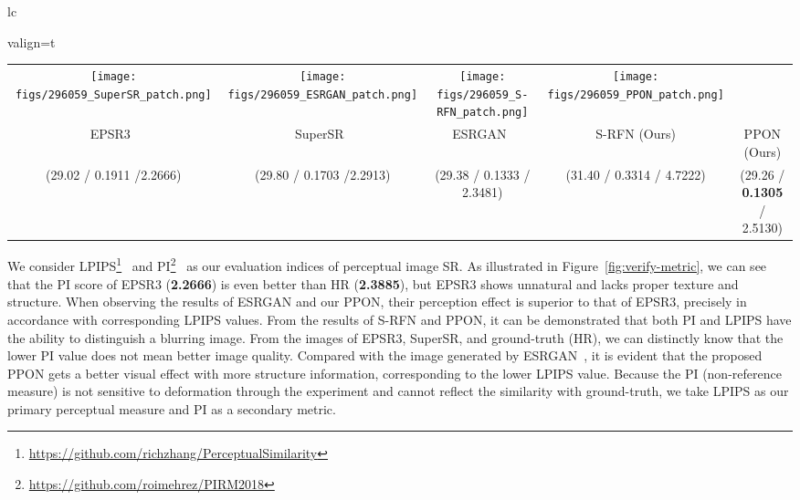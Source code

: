 \documentclass[preprint]{elsarticle}
\begin{document}
\begin{figure*}[htpb]
{\begin{tabular}{lc}
\begin{adjustbox}{valign=t}
\begin{tabular}{ccccc}
				\hspace{-3mm}
				\texttt{[image: figs/296059\_SuperSR\_patch.png]} &
				\hspace{-3mm}
				\texttt{[image: figs/296059\_ESRGAN\_patch.png]} &
				\hspace{-3mm}
				\texttt{[image: figs/296059\_S-RFN\_patch.png]} &
				\hspace{-3mm}
				\texttt{[image: figs/296059\_PPON\_patch.png]}  \\
				EPSR3~\cite{EPSR} & SuperSR~\cite{ESRGAN} & ESRGAN~\cite{ESRGAN} & S-RFN (Ours) & PPON (Ours) \\
				(29.02 / 0.1911 /2.2666) & \hspace{-3mm} (29.80 / 0.1703 /2.2913) & \hspace{-3mm} (29.38 / 0.1333 / 2.3481) & \hspace{-3mm} (31.40 / 0.3314 / 4.7222) & \hspace{-3mm} (29.26 / \textbf{0.1305} / 2.5130)
			\end{tabular}
		\end{adjustbox}
	\end{tabular} }
	\caption{A visual comparison with the state-of-the-art perceptual image SR algorithms.}
	\label{fig:verify-metric}
\end{figure*}

We consider LPIPS\footnote{\url{https://github.com/richzhang/PerceptualSimilarity}}~\cite{LPIPS} and PI\footnote{\url{https://github.com/roimehrez/PIRM2018}}~\cite{PIRM-SR} as our evaluation indices of perceptual image SR. As illustrated in Figure~\ref{fig:verify-metric}, we can see that the PI score of EPSR3 (\textbf{2.2666}) is even better than HR (\textbf{2.3885}), but EPSR3 shows unnatural and lacks proper texture and structure. When observing the results of ESRGAN and our PPON, their perception effect is superior to that of EPSR3, precisely in accordance with corresponding LPIPS values. From the results of S-RFN and PPON, it can be demonstrated that both PI and LPIPS have the ability to distinguish a blurring image. From the images of EPSR3, SuperSR, and ground-truth (HR), we can distinctly know that the lower PI value does not mean better image quality. Compared with the image generated by ESRGAN~\cite{ESRGAN}, it is evident that the proposed PPON gets a better visual effect with more structure information, corresponding to the lower LPIPS value. Because the PI (non-reference measure) is not sensitive to deformation through the experiment and cannot reflect the similarity with ground-truth, we take LPIPS as our primary perceptual measure and PI as a secondary metric.
\end{document}
